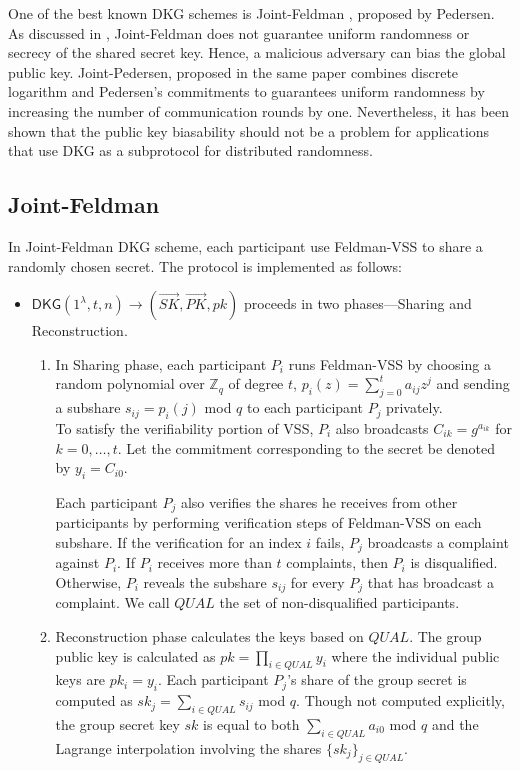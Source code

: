\documentclass[letterpaper,twocolumn,10pt]{article}
\theoremstyle{definition}
\theoremstyle{remark}
\begin{document}
One of the best known DKG schemes is Joint-Feldman \cite{pedersen1991threshold}, proposed by Pedersen. As discussed in \cite{gennaro1999secure}, Joint-Feldman does not guarantee uniform randomness or secrecy of the shared secret key. Hence, a malicious adversary can bias the global public key. Joint-Pedersen, proposed in the same paper combines discrete logarithm and Pedersen's commitments to guarantees uniform randomness by increasing the number of communication rounds by one. Nevertheless, it has been shown that the public key biasability should not be a problem for applications that use DKG as a subprotocol for distributed randomness.

\subsection{Joint-Feldman}
\label{appendix:jointFeldman}
In Joint-Feldman DKG scheme, each participant use Feldman-VSS to share a randomly chosen secret. The protocol is implemented as follows:
\begin{itemize}
    \item $\mathsf{DKG}(1^{\lambda}, t, n) \rightarrow (\vec{SK}, \vec{PK}, pk)$ proceeds in two phases---Sharing and Reconstruction.
    \begin{enumerate}
        \item In Sharing phase, each participant $P_i$ runs Feldman-VSS by choosing a random polynomial over $\mathbb{Z}_q$ of degree $t$, $p_i(z) = \sum_{j = 0}^{t} a_{ij} z^j$ and sending a subshare $s_{ij} = p_i(j)$ mod $q$ to each participant $P_j$ privately. \\
        To satisfy the verifiability portion of VSS, $P_i$ also broadcasts $C_{ik} = g^{a_{ik}}$ for $k = 0, \ldots, t$. Let the commitment corresponding to the secret be denoted by $y_i = C_{i0}$.
        
        Each participant $P_j$ also verifies the shares he receives from other participants by performing verification steps of Feldman-VSS on each subshare. If the verification for an index $i$ fails, $P_j$ broadcasts a complaint against $P_i$. If $P_i$ receives more than $t$ complaints, then $P_i$ is disqualified. Otherwise, $P_i$ reveals the subshare $s_{ij}$ for every $P_j$ that has broadcast a complaint. We call $QUAL$ the set of non-disqualified participants.
        
        \item Reconstruction phase calculates the keys based on $QUAL$.
        The group public key is calculated as $pk = \prod_{i \in QUAL} y_i$ where the individual public keys are $pk_i = y_i$. Each participant $P_j$'s share of the group secret is computed as $sk_j = \sum_{i \in QUAL} s_{ij}$ mod $q$. Though not computed explicitly, the group secret key $sk$ is equal to both $\sum_{i \in QUAL} a_{i0}$ mod $q$ and the Lagrange interpolation involving the shares $\{sk_j\}_{j \in QUAL}$.
    \end{enumerate}
\end{itemize}
\end{document}
